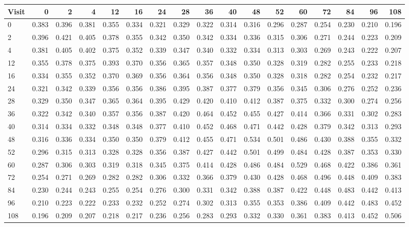 \small
\begin{tabular}{lrrrrrrrrrrrrrrrr}
\hline
Visit & 0 & 2 & 4 & 12 & 16 & 24 & 28 & 36 & 40 & 48 & 52 & 60 & 72 & 84 & 96 & 108 \\
\hline
0 & 0.383 & 0.396 & 0.381 & 0.355 & 0.334 & 0.321 & 0.329 & 0.322 & 0.314 & 0.316 & 0.296 & 0.287 & 0.254 & 0.230 & 0.210 & 0.196 \\
2 & 0.396 & 0.421 & 0.405 & 0.378 & 0.355 & 0.342 & 0.350 & 0.342 & 0.334 & 0.336 & 0.315 & 0.306 & 0.271 & 0.244 & 0.223 & 0.209 \\
4 & 0.381 & 0.405 & 0.402 & 0.375 & 0.352 & 0.339 & 0.347 & 0.340 & 0.332 & 0.334 & 0.313 & 0.303 & 0.269 & 0.243 & 0.222 & 0.207 \\
12 & 0.355 & 0.378 & 0.375 & 0.393 & 0.370 & 0.356 & 0.365 & 0.357 & 0.348 & 0.350 & 0.328 & 0.319 & 0.282 & 0.255 & 0.233 & 0.218 \\
16 & 0.334 & 0.355 & 0.352 & 0.370 & 0.369 & 0.356 & 0.364 & 0.356 & 0.348 & 0.350 & 0.328 & 0.318 & 0.282 & 0.254 & 0.232 & 0.217 \\
24 & 0.321 & 0.342 & 0.339 & 0.356 & 0.356 & 0.386 & 0.395 & 0.387 & 0.377 & 0.379 & 0.356 & 0.345 & 0.306 & 0.276 & 0.252 & 0.236 \\
28 & 0.329 & 0.350 & 0.347 & 0.365 & 0.364 & 0.395 & 0.429 & 0.420 & 0.410 & 0.412 & 0.387 & 0.375 & 0.332 & 0.300 & 0.274 & 0.256 \\
36 & 0.322 & 0.342 & 0.340 & 0.357 & 0.356 & 0.387 & 0.420 & 0.464 & 0.452 & 0.455 & 0.427 & 0.414 & 0.366 & 0.331 & 0.302 & 0.283 \\
40 & 0.314 & 0.334 & 0.332 & 0.348 & 0.348 & 0.377 & 0.410 & 0.452 & 0.468 & 0.471 & 0.442 & 0.428 & 0.379 & 0.342 & 0.313 & 0.293 \\
48 & 0.316 & 0.336 & 0.334 & 0.350 & 0.350 & 0.379 & 0.412 & 0.455 & 0.471 & 0.534 & 0.501 & 0.486 & 0.430 & 0.388 & 0.355 & 0.332 \\
52 & 0.296 & 0.315 & 0.313 & 0.328 & 0.328 & 0.356 & 0.387 & 0.427 & 0.442 & 0.501 & 0.499 & 0.484 & 0.428 & 0.387 & 0.353 & 0.330 \\
60 & 0.287 & 0.306 & 0.303 & 0.319 & 0.318 & 0.345 & 0.375 & 0.414 & 0.428 & 0.486 & 0.484 & 0.529 & 0.468 & 0.422 & 0.386 & 0.361 \\
72 & 0.254 & 0.271 & 0.269 & 0.282 & 0.282 & 0.306 & 0.332 & 0.366 & 0.379 & 0.430 & 0.428 & 0.468 & 0.496 & 0.448 & 0.409 & 0.383 \\
84 & 0.230 & 0.244 & 0.243 & 0.255 & 0.254 & 0.276 & 0.300 & 0.331 & 0.342 & 0.388 & 0.387 & 0.422 & 0.448 & 0.483 & 0.442 & 0.413 \\
96 & 0.210 & 0.223 & 0.222 & 0.233 & 0.232 & 0.252 & 0.274 & 0.302 & 0.313 & 0.355 & 0.353 & 0.386 & 0.409 & 0.442 & 0.483 & 0.452 \\
108 & 0.196 & 0.209 & 0.207 & 0.218 & 0.217 & 0.236 & 0.256 & 0.283 & 0.293 & 0.332 & 0.330 & 0.361 & 0.383 & 0.413 & 0.452 & 0.506 \\
\hline
\end{tabular}

